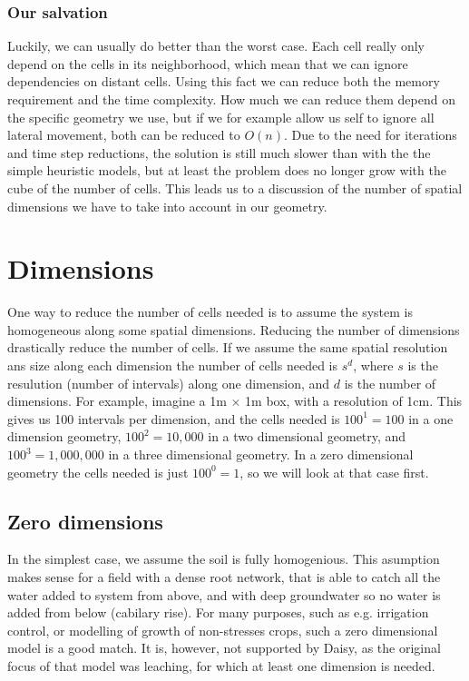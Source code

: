\documentclass[a4paper,11pt,twoside]{article}
\begin{document}
\subsubsection{Our salvation}

Luckily, we can usually do better than the worst case.  Each cell
really only depend on the cells in its neighborhood, which mean that
we can ignore dependencies on distant cells.  Using this fact we can
reduce both the memory requirement and the time complexity.  How much
we can reduce them depend on the specific geometry we use, but if we
for example allow us self to ignore all lateral movement, both can be
reduced to $O(n)$.  Due to the need for iterations and time step
reductions, the solution is still much slower than with the the simple
heuristic models, but at least the problem does no longer grow with
the cube of the number of cells.  This leads us to a discussion of the
number of spatial dimensions we have to take into account in our
geometry.

\section{Dimensions}

One way to reduce the number of cells needed is to assume the system
is homogeneous along some spatial dimensions.  Reducing the number of
dimensions drastically reduce the number of cells.  If we assume the
same spatial resolution ans size along each dimension the number of
cells needed is $s^d$, where $s$ is the resulution (number of
intervals) along one dimension, and $d$ is the number of dimensions.
For example, imagine a 1m $\times$ 1m box, with a resolution of 1cm.
This gives us 100 intervals per dimension, and the cells needed is
$100^1 = 100$ in a one dimension geometry, $100^2 = 10,000$ in a two
dimensional geometry, and $100^3 = 1,000,000$ in a three dimensional
geometry.  In a zero dimensional geometry the cells needed is just
$100^0 = 1$, so we will look at that case first.

\subsection{Zero dimensions}

In the simplest case, we assume the soil is fully homogenious.  This
asumption makes sense for a field with a dense root network, that is
able to catch all the water added to system from above, and with deep
groundwater so no water is added from below (cabilary rise).  For many
purposes, such as e.g. irrigation control, or modelling of growth of
non-stresses crops, such a zero dimensional model is a good match.  It
is, however, not supported by Daisy, as the original focus of that
model was leaching, for which at least one dimension is needed.
\end{document}
